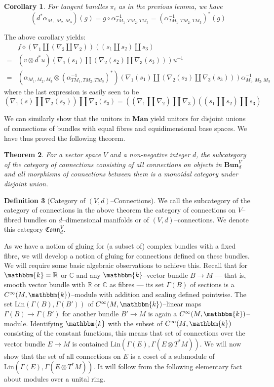 \documentclass{amsart}
\newcommand{\R}{\mathbb{R}}
\newcommand{\C}{\mathbb{C}}
\newcommand{\K}{\mathbbm{k}}
\newcommand{\tensor}{\otimes}
\renewcommand{\to}[1][]{\stackrel{#1}{\longrightarrow}}
\newcommand{\br}[1]{\left( #1 \right)}
\newcommand{\Lin}{\textrm{Lin}}
\newcommand{\Man}{\textbf{Man}}
\newcommand{\Bun}{\textbf{Bun}}
\newcommand{\Conn}{\mathfrak{Conn}}
\newcommand{\Cinf}{C^{\infty}}
\newtheorem{thm}{Theorem}
\numberwithin{thm}{section}
\newtheorem{cor}[thm]{Corollary}
\theoremstyle{definition}
\newtheorem{defn}[thm]{Definition}
\begin{document}
\begin{cor}
For tangent bundles $\pi_i$ as in the previous lemma, we have
\[
  (d^*\alpha_{M_1, M_2, M_3})(g) = g \circ \alpha_{TM_1, TM_2, TM_3}^{-1}
    = \br{\alpha^{-1}_{TM_1, TM_2, TM_3}}^*(g)
\]
\end{cor}
The above corollary yields:
\begin{align*}
   & f \diamond (\nabla_1 \amalg (\nabla_2 \amalg \nabla_2))(
        (s_1 \amalg s_2) \amalg s_3
     ) \\
  =& (v \tensor d^*u)(
      \nabla_1(s_1) \amalg (\nabla_2(s_2) \amalg \nabla_3(s_3))
     )u^{-1} \\
  =& \br{\alpha_{M_1, M_2, M_3} \tensor \br{\alpha^{-1}_{TM_1, TM_2, TM_3}}^*}(
      \nabla_1(s_1) \amalg (\nabla_2(s_2) \amalg \nabla_3(s_3))
     )\alpha_{M_1, M_2, M_3}^{-1}
\end{align*}
where the last expression is easily seen to be
\[
  (\nabla_1(s) \amalg \nabla_2(s_2)) \amalg \nabla_3(s_3)
  = ((\nabla_1 \amalg \nabla_2) \amalg \nabla_3)((s_1 \amalg s_2) \amalg s_3)
\]

We can similarly show that the unitors in $\Man$ yield unitors for disjoint
unions of connections of bundles with equal fibres and equidimensional base
spaces. We have thus proved the following theorem.
\begin{thm}\label{thm:bundle_cat}
For a vector space $V$ and a non-negative integer $d$, the subcategory of the
category of connections consisting of all connections on objects in
$\Bun_d^{V}$ and all morphisms of connections between them is a monoidal
category under disjoint union.
\end{thm}
\begin{defn}[Category of {$(V, d)$}--Connections]
We call the subcategory of the category of connections in the above theorem the
category of connections on $V$--fibred bundles on $d$--dimensional manifolds or
of $(V, d)$--connections. We denote this category $\Conn^V_d$.
\end{defn}

As we have a notion of gluing for (a subset of) complex bundles with a fixed
fibre, we will develop a notion of gluing for connections defined on these
bundles. We will require some basic algebraic observations to achieve this.
Recall that for $\K = \R$ or $\C$ and any
$\K$--vector bundle $B \to M$ --- that is, smooth vector bundle with $\R$
or $\C$ as fibres --- its set $\Gamma(B)$ of sections is a
$\Cinf(M, \K)$--module with addition and scaling defined pointwise.
The set $\Lin\br{\Gamma(B), \Gamma(B')}$ of $\Cinf(M, \K)$--linear maps
$\Gamma(B) \to \Gamma(B')$ for another bundle $B' \to M$ is again a
$\Cinf(M, \K)$--module.  Identifying $\K$ with the subset of $\Cinf(M, \K)$ consisting of the constant
functions, this means that set of connections over the vector bundle $E \to M$
is contained $\Lin\br{\Gamma(E), \Gamma(E \tensor T^*M)}$.
We will now show that the set of all connections on $E$ is a coset of
a submodule of $\Lin\br{\Gamma(E), \Gamma(E \tensor T^*M)}$. It will follow from
the following elementary fact about modules over a unital ring.
\end{document}
